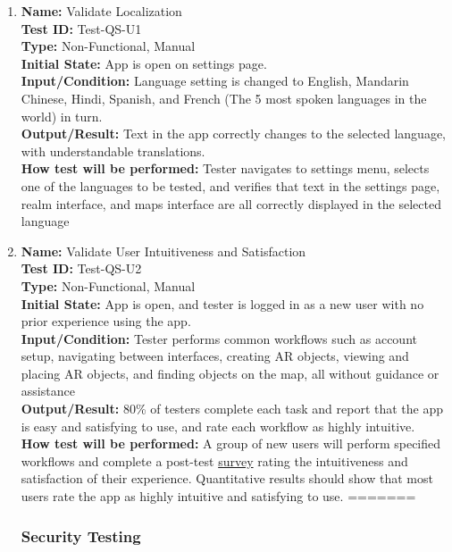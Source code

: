 \documentclass[12pt, titlepage]{article}
\begin{document}
\begin{enumerate}

    \item \textbf{Name:} Validate Localization \label{itm:Test-QS-U1} \\
    \textbf{Test ID:} Test-QS-U1 \\
    \textbf{Type:} Non-Functional, Manual \\
    \textbf{Initial State:} App is open on settings page. \\
    \textbf{Input/Condition:} Language setting is changed to English, Mandarin Chinese, Hindi, Spanish, and French (The 5 most spoken languages in the world) in turn.  \\
    \textbf{Output/Result:} Text in the app correctly changes to the selected language, with understandable translations. \\
    \textbf{How test will be performed:} Tester navigates to settings menu, selects one of the languages to be tested, and verifies that text in the settings page, realm interface, and maps interface are all correctly displayed in the selected language

    \item \textbf{Name:} Validate User Intuitiveness and Satisfaction \label{itm:Test-QS-U2} \\
    \textbf{Test ID:} Test-QS-U2 \\
    \textbf{Type:} Non-Functional, Manual \\
    \textbf{Initial State:} App is open, and tester is logged in as a new user with no prior experience using the app. \\
    \textbf{Input/Condition:} Tester performs common workflows such as account setup, navigating between interfaces, creating AR objects, viewing and placing AR objects, and finding objects on the map, all without guidance or assistance  \\
    \textbf{Output/Result:} 80\% of testers complete each task and report that the app is easy and satisfying to use, and rate each workflow as highly intuitive.\\
    \textbf{How test will be performed:} A group of new users will perform specified workflows and complete a post-test \hyperref[sub:usability_survey]{survey} rating the intuitiveness and satisfaction of their experience. Quantitative results should show that most users rate the app as highly intuitive and satisfying to use.
=======
\subsubsection{Security Testing}


\end{enumerate}
\end{document}
